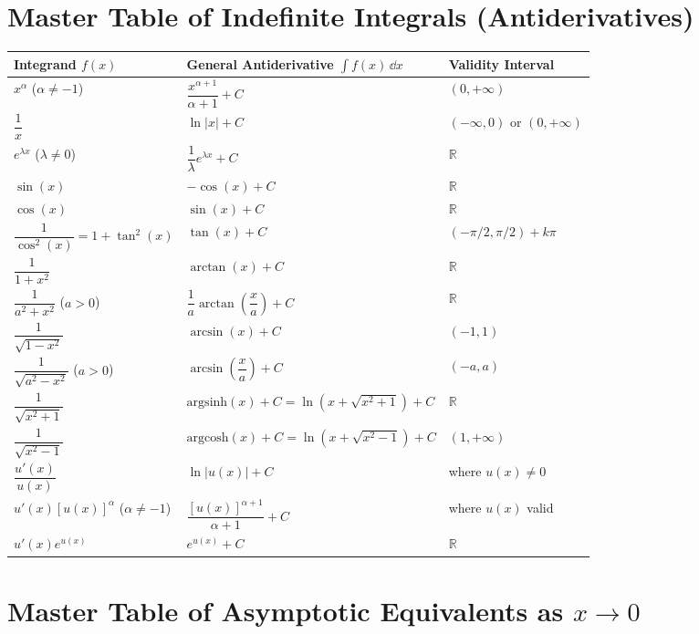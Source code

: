 \section{Master Table of Indefinite Integrals (Antiderivatives)}

\renewcommand{\arraystretch}{1.35}
\begin{longtable}{@{}lll@{}}
\toprule
\textbf{Integrand} $f(x)$ & \textbf{General Antiderivative} $\int f(x)\,\dd x$ & \textbf{Validity Interval} \\
\midrule
\endhead
$x^\alpha$ ($\alpha \neq -1$) & $\dfrac{x^{\alpha+1}}{\alpha + 1} + C$ & $(0, +\infty)$ \\
$\dfrac{1}{x}$ & $\ln|x| + C$ & $(-\infty, 0)$ or $(0, +\infty)$ \\
$e^{\lambda x}$ ($\lambda \neq 0$) & $\dfrac{1}{\lambda} e^{\lambda x} + C$ & $\mathbb{R}$ \\
$\sin(x)$ & $-\cos(x) + C$ & $\mathbb{R}$ \\
$\cos(x)$ & $\sin(x) + C$ & $\mathbb{R}$ \\
$\dfrac{1}{\cos^2(x)} = 1 + \tan^2(x)$ & $\tan(x) + C$ & $(-\pi/2, \pi/2) + k\pi$ \\
$\dfrac{1}{1 + x^2}$ & $\arctan(x) + C$ & $\mathbb{R}$ \\
$\dfrac{1}{a^2 + x^2}$ ($a > 0$) & $\dfrac{1}{a} \arctan\left(\dfrac{x}{a}\right) + C$ & $\mathbb{R}$ \\
$\dfrac{1}{\sqrt{1 - x^2}}$ & $\arcsin(x) + C$ & $(-1, 1)$ \\
$\dfrac{1}{\sqrt{a^2 - x^2}}$ ($a > 0$) & $\arcsin\left(\dfrac{x}{a}\right) + C$ & $(-a, a)$ \\
$\dfrac{1}{\sqrt{x^2 + 1}}$ & $\mathrm{argsinh}(x) + C = \ln\left(x + \sqrt{x^2 + 1}\right) + C$ & $\mathbb{R}$ \\
$\dfrac{1}{\sqrt{x^2 - 1}}$ & $\mathrm{argcosh}(x) + C = \ln\left(x + \sqrt{x^2 - 1}\right) + C$ & $(1, +\infty)$ \\
$\dfrac{u'(x)}{u(x)}$ & $\ln|u(x)| + C$ & where $u(x) \neq 0$ \\
$u'(x) [u(x)]^\alpha$ ($\alpha \neq -1$) & $\dfrac{[u(x)]^{\alpha+1}}{\alpha + 1} + C$ & where $u(x)$ valid \\
$u'(x) e^{u(x)}$ & $e^{u(x)} + C$ & $\mathbb{R}$ \\
\bottomrule
\end{longtable}

\section{Master Table of Asymptotic Equivalents as $x \to 0$}

